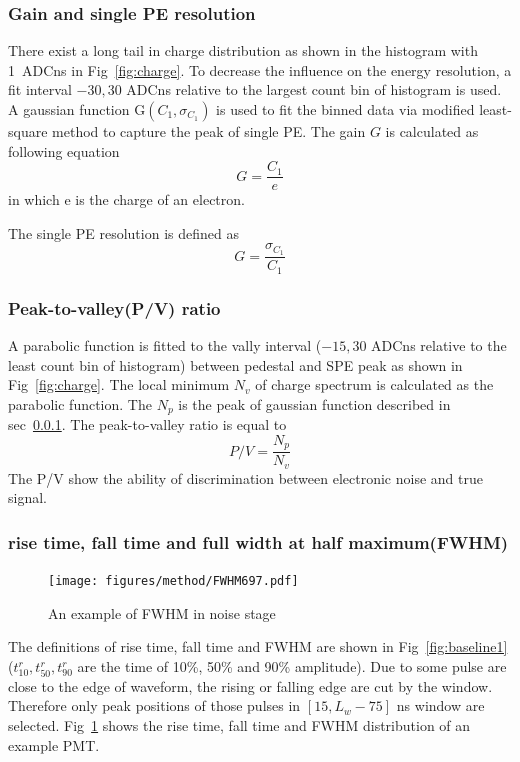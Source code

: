 \subsubsection{Gain and single PE resolution}
\label{sec:noisegain}
There exist a long tail in charge distribution as shown in the histogram with \SI{1}{ADCns} in Fig~\ref{fig:charge}. To decrease the influence on the energy resolution, a fit interval $-30, 30$ ADCns relative to the largest count bin of histogram is used. A gaussian function G$(C_1,\sigma_{C_1})$ is used to fit the binned data via modified least-square method to capture the peak of single PE. The gain $G$ is calculated as following equation
\begin{equation}
    G=\frac{C_1}{e}
\end{equation}
in which e is the charge of an electron.

The single PE resolution is defined as
\begin{equation}
    G=\frac{\sigma_{C_1}}{C_1}
\end{equation}
\subsubsection{Peak-to-valley(P/V) ratio}
A parabolic function is fitted to the vally interval ($-15, 30$ ADCns relative to the least count bin of histogram) between pedestal and SPE peak as shown in Fig~\ref{fig:charge}. The local minimum $N_v$ of charge spectrum is calculated as the parabolic function. The $N_p$ is the peak of gaussian function described in sec~\ref{sec:noisegain}. The peak-to-valley ratio is equal to  
\begin{equation}
    P/V=\frac{N_p}{N_v}
\end{equation}
The P/V show the ability of discrimination between electronic noise and true signal.
\subsubsection{rise time, fall time and full width at half maximum(FWHM)}
\begin{figure}[!htbp]
    \texttt{[image: figures/method/FWHM697.pdf]}
    \caption{An example of FWHM in noise stage}
    \label{fig:risefallFWHM}
\end{figure}
The definitions of rise time, fall time and FWHM are shown in Fig~\ref{fig:baseline1} ($t^r_{10}, t^r_{50}, t^r_{90}$ are the time of 10\%, 50\% and 90\% amplitude). Due to some pulse are close to the edge of waveform, the rising or falling edge are cut by the window. Therefore only peak positions of those pulses in $[15, L_w-75]$ ns window are selected. Fig~\ref{fig:risefallFWHM} shows the rise time, fall time and FWHM distribution of an example PMT.

